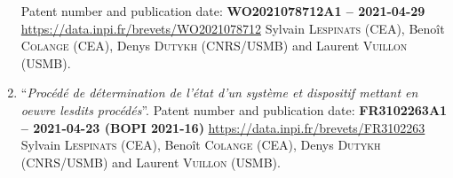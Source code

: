 \begin{enumerate}
        Patent number and publication date: \textbf{WO2021078712A1 -- 2021-04-29}\newline
        \url{https://data.inpi.fr/brevets/WO2021078712}\newline
        Sylvain \textsc{Lespinats} (CEA), Beno\^it \textsc{Colange} (CEA), Denys \textsc{Dutykh} (CNRS/USMB) and Laurent \textsc{Vuillon} (USMB).
    \item ``\textit{Proc\'ed\'e de d\'etermination de l'\'etat d'un syst\`eme et dispositif mettant en oeuvre lesdits proc\'ed\'es}''.\newline
        Patent number and publication date: {\small\textbf{FR3102263A1 -- 2021-04-23 (BOPI 2021-16)}}\newline
        \url{https://data.inpi.fr/brevets/FR3102263}\newline
        Sylvain \textsc{Lespinats} (CEA), Beno\^it \textsc{Colange} (CEA), Denys \textsc{Dutykh} (CNRS/USMB) and Laurent \textsc{Vuillon} (USMB).
\end{enumerate}